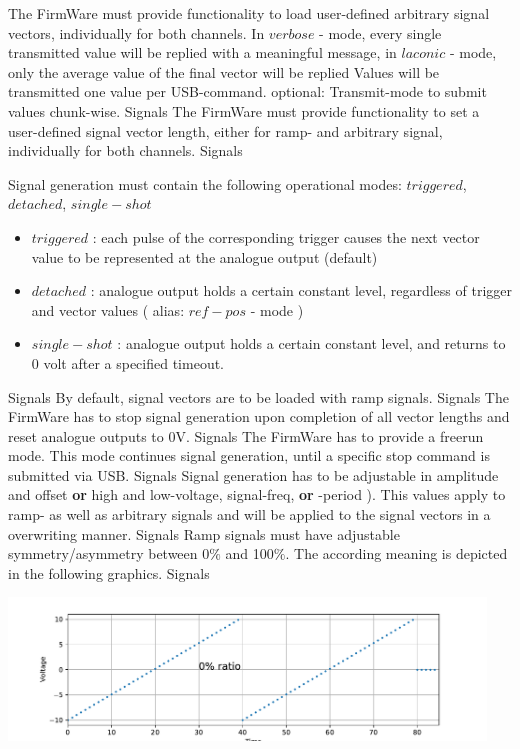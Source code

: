 	{The FirmWare must provide functionality to load user-defined arbitrary signal vectors, individually for both channels. 
		In $verbose$ - mode, every single transmitted value will be replied with a meaningful message, in $laconic$ - mode, only the average value of the final vector will be replied
		Values will be transmitted one value per USB-command. optional: Transmit-mode to submit values chunk-wise.	}
	{}{}{}{Signals}
	{ The FirmWare must provide functionality to set a user-defined signal vector length, either for ramp- and arbitrary signal, individually for both channels. }
	{}{}{}{Signals}
	{ Signal generation must contain the following operational modes:  $triggered$, $detached$, $single-shot$
		\begin{itemize}
		\item $triggered$ : each pulse of the corresponding trigger causes the next vector value to be represented at the analogue output (default)
		\item $detached$ : analogue output holds a certain constant level, regardless of trigger and vector values ( alias: $ref-pos$ - mode )
		\item $single-shot$ : analogue output holds a certain constant level, and returns to 0 volt after a specified timeout.
		\end{itemize}	}
	{}{}{}{Signals}
	{ By default, signal vectors are to be loaded with ramp signals.}
	{}{}{}{Signals}
	{ The FirmWare has to stop signal generation upon completion of all vector lengths and reset analogue outputs to 0V. }
	{}{}{}{Signals}
	{ The FirmWare has to provide a freerun mode. This mode continues signal generation, until a specific stop command is submitted via USB.}
	{}{}{}{Signals}
	{ Signal generation has to be adjustable in amplitude and offset  {\bf or}  high and low-voltage, signal-freq, {\bf or} -period ). This values apply to ramp- as well as arbitrary signals and will be applied to the signal vectors in a overwriting manner. }
	{}{}{}{Signals}
	{Ramp signals must have adjustable symmetry/asymmetry between 0$\%$ and 100$\%$. The according meaning is depicted in the following graphics. }
	{}{}{}{Signals}
		\begin{center}
		\includegraphics[width=0.95\textwidth]{src/_rampAssymetry0perc.pdf}
		\end{center}
